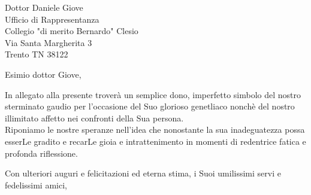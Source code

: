 \documentclass{letter}
\begin{document}
\begin{letter}{Dottor Daniele Giove \\ Ufficio di Rappresentanza \\ Collegio "di merito Bernardo" Clesio \\ Via Santa Margherita 3 \\ Trento TN 38122}
    \opening{Esimio dottor Giove,}
    In allegato alla presente troverà un semplice dono, imperfetto simbolo del nostro sterminato gaudio per l'occasione del Suo glorioso genetliaco nonchè del nostro illimitato affetto nei confronti della Sua persona.\\
    Riponiamo le nostre speranze nell'idea che nonostante la sua inadeguatezza possa esserLe gradito e recarLe gioia e intrattenimento in momenti di redentrice fatica e profonda riflessione.
    \closing{Con ulteriori auguri e felicitazioni ed eterna stima, i Suoi umilissimi servi e fedelissimi amici,}
\end{letter}
\end{document}
